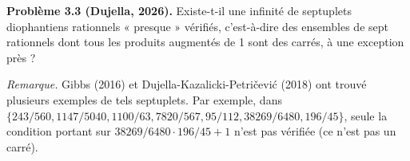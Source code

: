 \textbf{Problème 3.3 (Dujella, 2026).} Existe-t-il une infinité de septuplets diophantiens rationnels « presque » vérifiés, c'est-à-dire des ensembles de sept rationnels dont tous les produits augmentés de 1 sont des carrés, à une exception près ?

\medskip

\textit{Remarque.} Gibbs (2016) et Dujella-Kazalicki-Petričević (2018) ont trouvé plusieurs exemples de tels septuplets. Par exemple, dans $\{243/560, 1147/5040, 1100/63, 7820/567, 95/112, 38269/6480, 196/45\}$, seule la condition portant sur $38269/6480 \cdot 196/45+1$ n'est pas vérifiée (ce n'est pas un carré).
